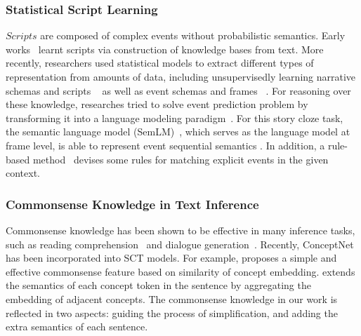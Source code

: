\subsubsection*{Statistical Script Learning}
$Scripts$ are composed of complex events without probabilistic semantics.
Early works~\cite{schank2013scripts,mooney1985learning} learnt scripts 
via construction of knowledge bases from text. 
More recently, researchers used statistical models to extract different types 
of representation from amounts of data, including unsupervisedly learning 
narrative schemas and scripts
~\cite{chambers2009unsupervised,regneri2011learning} as well as event schemas and frames 
~\cite{chambers2011template,balasubramanian2013generating,sha2016joint,huang2016liberal}.
For reasoning over these knowledge, researches tried to solve event
 prediction problem by transforming it into a language modeling paradigm~\cite{pichotta2014statistical,rudinger2015script,hu2017happens}.
For this story cloze task, the semantic language model (SemLM)~\cite{peng2016two},
which serves as the language model at frame level,
is able to represent event sequential semantics
\cite{li2018multi,chaturvedi2017story}. In addition, a rule-based 
method~\cite{lin2017reasoning} devises some rules for matching 
explicit events in the given context. 

\subsubsection*{Commonsense Knowledge in Text Inference}
Commonsense knowledge has been shown to be effective in many
inference tasks,
such as reading comprehension~\cite{mihaylov2018knowledgeable}
and dialogue generation~\cite{liu2018knowledge}.
Recently, ConceptNet has been incorporated into SCT models.
For example,  proposes a simple and
effective commonsense feature based on similarity of concept embedding.
 extends the semantics of each concept token
in the sentence by aggregating the embedding of adjacent concepts.
The commonsense knowledge in our work is reflected in two aspects:
guiding the process of simplification,
and adding the extra semantics of each sentence.








